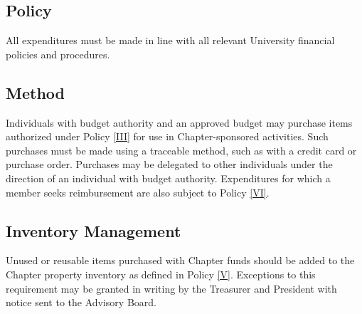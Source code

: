 
\subsection{Policy} \label{IV.1}
All expenditures must be made in line with all relevant University financial policies and procedures.

\subsection{Method} \label{IV.2}
Individuals with budget authority and an approved budget may purchase items authorized under Policy \ref{III} for use in Chapter-sponsored activities. 
Such purchases must be made using a traceable method, such as with a credit card or purchase order. 
Purchases may be delegated to other individuals under the direction of an individual with budget authority. 
Expenditures for which a member seeks reimbursement are also subject to Policy \ref{VI}.

\subsection{Inventory Management} \label{IV.3}
Unused or reusable items purchased with Chapter funds should be added to the Chapter property inventory as defined in Policy \ref{V}. 
Exceptions to this requirement may be granted in writing by the Treasurer and President with notice sent to the Advisory Board.

